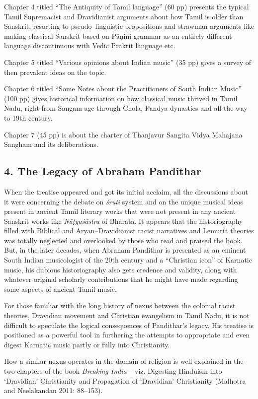 Chapter 4 titled “The Antiquity of Tamil language” (60 pp) presents the typical Tamil Supremacist and Dravidianist arguments about how Tamil is older than Sanskrit, resorting to pseudo–linguistic propositions and strawman arguments like making classical Sanskrit based on Pāṇini grammar as an entirely different language discontinuous with Vedic Prakrit language etc.

Chapter 5 titled “Various opinions about Indian music” (35 pp) gives a survey of then prevalent ideas on the topic.

Chapter 6 titled “Some Notes about the Practitioners of South Indian Music” (100 pp) gives historical information on how classical music thrived in Tamil Nadu, right from Sangam age through Chola, Pandya dynasties and all the way to 19th century.

Chapter 7 (45 pp) is about the charter of Thanjavur Sangita Vidya Mahajana Sangham and its deliberations.


\subsection*{4. The Legacy of Abraham Pandithar}

When the treatise appeared and got its initial acclaim, all the discussions about it were concerning the debate on \textit{śruti }system and on the unique musical ideas present in ancient Tamil literary works that were not present in any ancient Sanskrit works like \textit{Nāṭyaśāstra} of Bharata. It appears that the historiography filled with Biblical and Aryan–Dravidianist racist narratives and Lemuria theories was totally neglected and overlooked by those who read and praised the book. But, in the later decades, when Abraham Pandithar is presented as an eminent South Indian musicologist of the 20th century and a “Christian icon” of Karnatic music, his dubious historiography also gets credence and validity, along with whatever original scholarly contributions that he might have made regarding some aspects of ancient Tamil music.

For those familiar with the long history of nexus between the colonial racist theories, Dravidian movement and Christian evangelism in Tamil Nadu, it is not difficult to speculate the logical consequences of Pandithar’s legacy. His treatise is positioned as a powerful tool in furthering the attempts to appropriate and even digest Karnatic music partly or fully into Christianity.

How a similar nexus operates in the domain of religion is well explained in the two chapters of the book \textit{Breaking India} – viz. Digesting Hinduism into ‘Dravidian’ Christianity and Propagation of ‘Dravidian’ Christianity (Malhotra and Neelakandan 2011: 88–153).

